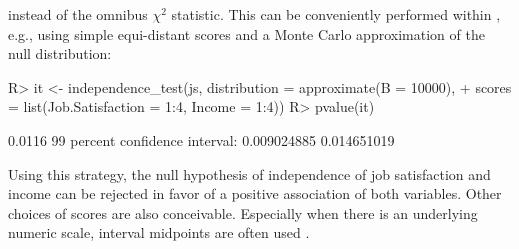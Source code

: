 \documentclass[article]{jss}
\begin{document}
instead of the omnibus $\chi^2$ statistic. This can be conveniently performed
within , e.g., using simple equi-distant scores and a Monte Carlo
approximation of the null distribution:
\begin{Schunk}
\begin{Sinput}
R> it <- independence_test(js, distribution = approximate(B = 10000),
+    scores = list(Job.Satisfaction = 1:4, Income = 1:4))
R> pvalue(it)
\end{Sinput}
\begin{Soutput}
[1] 0.0116
99 percent confidence interval:
 0.009024885 0.014651019 
\end{Soutput}
\end{Schunk}
Using this strategy, the null hypothesis of independence of job satisfaction
and income can be rejected in favor of a positive association of both variables.
Other choices of scores are also conceivable. Especially when there is an underlying
numeric scale, interval midpoints are often used \citep[see][for an example]{Hothorn:2006:AmStat}.
\end{document}
